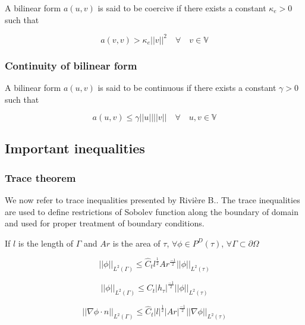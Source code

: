 \documentclass[a4paper,openany]{book}
\begin{document}
\begin{appendices}
A bilinear form $a(u,v)$ is said to be coercive if there exists a constant $\kappa_e > 0$ such that

\begin{equation}\label{Coercivity}
a(v,v) > \kappa_e ||v||^2   \quad \forall \quad v \in  \mathbb{V}
\end{equation}

\subsubsection{Continuity of bilinear form}

A bilinear form $a(u,v)$ is said to be continuous if there exists a constant $\gamma > 0$ such that

\begin{equation}\label{Continuity_constant}
a(u,v) \leq \gamma ||u||||v|| \quad  \forall \quad u,v \in  \mathbb{V}
\end{equation}

\subsection{Important inequalities}

\subsubsection{Trace theorem} 

We now refer to trace inequalities presented by Rivi\`ere B.\cite{riviere}. The trace inequalities are used to define restrictions of Sobolev function along the boundary of domain and used for proper treatment of boundary conditions. 

If $l$ is the length of $\Gamma$ and $Ar$ is the area of $\tau$,  $\forall \phi \in P^D (\tau)$, $\forall \Gamma \subset \partial \Omega$

\begin{equation}
||\phi||_{L^2(\Gamma)} \leq \hat{C}_t l^{\frac{1}{2}} Ar^{\frac{-1}{2}} ||\phi||_{L^2(\tau)}
\end{equation}

\begin{equation}
||\phi||_{L^2(\Gamma)} \leq {C}_t |h_\tau|^{\frac{-1}{2}} ||\phi||_{L^2(\tau)}
\end{equation}

\begin{equation}
||\nabla \phi \cdot n||_{L^2(\Gamma)} \leq \hat{C}_t |l|^{\frac{1}{2}} |Ar|^{\frac{-1}{2}} ||\nabla \phi||_{L^2(\tau)}
\end{equation}


\end{appendices}
\end{document}
